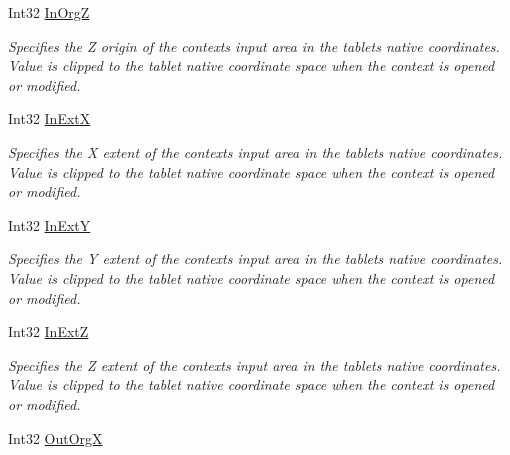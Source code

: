 \begin{DoxyCompactItemize}
Int32 \mbox{\hyperlink{class_wintab_d_n_1_1_c_wintab_context_afe123e2d48ea3c171c2b040dd512cda6}{In\+OrgZ}}
\begin{DoxyCompactList}\small\item\em Specifies the Z origin of the context\textquotesingle{}s input area in the tablet\textquotesingle{}s native coordinates. Value is clipped to the tablet native coordinate space when the context is opened or modified. \end{DoxyCompactList}\item 
Int32 \mbox{\hyperlink{class_wintab_d_n_1_1_c_wintab_context_a8f33e05910bcde9fe611f32a986a1ea5}{In\+ExtX}}
\begin{DoxyCompactList}\small\item\em Specifies the X extent of the context\textquotesingle{}s input area in the tablet\textquotesingle{}s native coordinates. Value is clipped to the tablet native coordinate space when the context is opened or modified. \end{DoxyCompactList}\item 
Int32 \mbox{\hyperlink{class_wintab_d_n_1_1_c_wintab_context_abb73e61691a4b2480b7997b73202b63b}{In\+ExtY}}
\begin{DoxyCompactList}\small\item\em Specifies the Y extent of the context\textquotesingle{}s input area in the tablet\textquotesingle{}s native coordinates. Value is clipped to the tablet native coordinate space when the context is opened or modified. \end{DoxyCompactList}\item 
Int32 \mbox{\hyperlink{class_wintab_d_n_1_1_c_wintab_context_a8d699ca76769679eca827b033e4f5fde}{In\+ExtZ}}
\begin{DoxyCompactList}\small\item\em Specifies the Z extent of the context\textquotesingle{}s input area in the tablet\textquotesingle{}s native coordinates. Value is clipped to the tablet native coordinate space when the context is opened or modified. \end{DoxyCompactList}\item 
Int32 \mbox{\hyperlink{class_wintab_d_n_1_1_c_wintab_context_a93f133c38a24202d1b3b7396893ed7fd}{Out\+OrgX}}

\end{DoxyCompactItemize}
